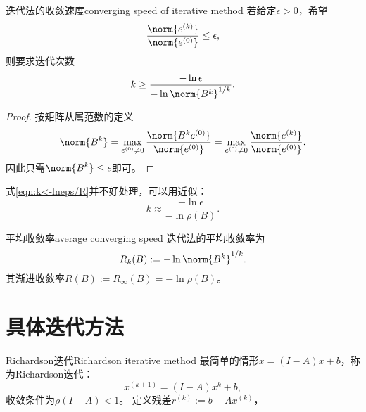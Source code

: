 \begin{theorem}
    {迭代法的收敛速度}{converging speed of iterative method}
    若给定$\epsilon>0$，希望
    \[
        \frac{\norm{e^{(k)}}}{\norm{e^{(0)}}}\leq\epsilon,
    \]
    则要求迭代次数
    \begin{equation}
        \label{eqn:k<-lneps/R}
        k\geq\frac{-\ln\epsilon}{-\ln\norm{B^k}^{1/k}}.
    \end{equation}
\end{theorem}

\begin{proof}
    按矩阵从属范数的定义
    \[
        \norm{B^k}=\max_{e^{(0)}\neq 0}\frac{\norm{B^ke^{(0)}}}{\norm{e^{(0)}}}=\max_{e^{(0)}\neq 0}\frac{\norm{e^{(k)}}}{\norm{e^{(0)}}}.
    \]
    因此只需$\norm{B^k}\leq\epsilon$即可。
\end{proof}

\begin{remark}
    式\eqref{eqn:k<-lneps/R}并不好处理，可以用近似：
    \[
        k\approx\frac{-\ln\epsilon}{-\ln\rho(B)}.
    \]
\end{remark}

\begin{definition}
    {平均收敛率}{average converging speed}
    迭代法的平均收敛率为
    \begin{equation}
        R_k(B):=-\ln\norm{B^k}^{1/k}.
    \end{equation}
    其渐进收敛率$R(B):=R_\infty(B)=-\ln\rho(B)$。
\end{definition}

\section{具体迭代方法}

\begin{example}
    {Richardson迭代}{Richardson iterative method}
    最简单的情形$x=(I-A)x+b$，称为Richardson迭代：
    \begin{equation}
        x^{(k+1)}=(I-A)x^{{k}}+b,
    \end{equation}
    收敛条件为$\rho(I-A)<1$。
    定义残差$r^{(k)}:=b-Ax^{(k)}$，
\end{example}

